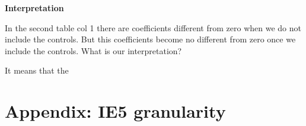\documentclass[12pt]{article}
\begin{document}
\newpage 











\textbf{Interpretation} 

In the second table col 1 there are coefficients different from zero when we do not include the controls. But this coefficients become no different from zero once we include the controls. 
What is our interpretation? 

It means that the 



\newpage






\section{Appendix: IE5 granularity}\label{sec:appendix_ie5}








\end{document}

